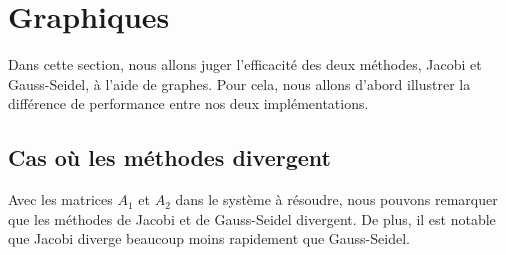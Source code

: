 




% 

\section{Graphiques}
Dans cette section, nous allons juger l'efficacité des deux méthodes, Jacobi et Gauss-Seidel, à l'aide de graphes. Pour cela, nous allons d'abord illustrer la différence de performance entre nos deux implémentations.
\subsection{Cas où les méthodes divergent}
Avec les matrices $A_1$ et $A_2$ dans le système à résoudre, nous pouvons remarquer que les méthodes de Jacobi et de Gauss-Seidel divergent. De plus, il est notable que Jacobi diverge beaucoup moins rapidement que Gauss-Seidel.

